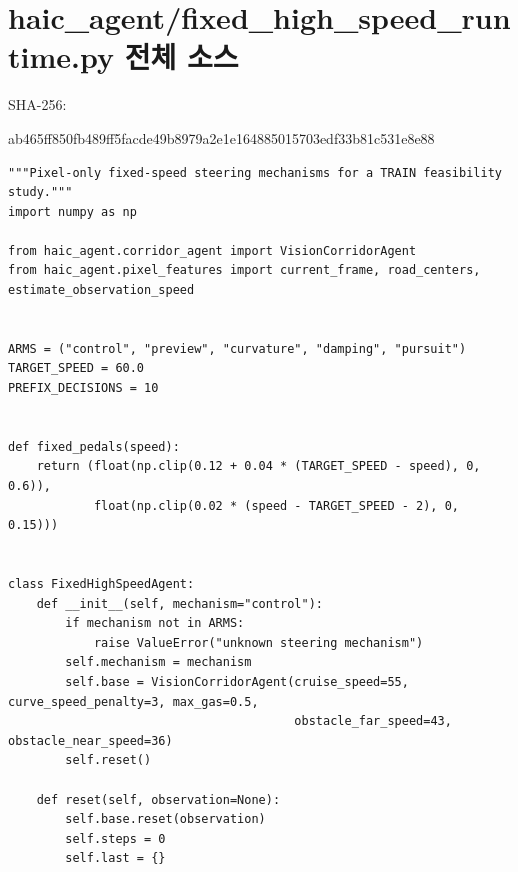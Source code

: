\documentclass[11pt,a4paper]{article}
\begin{document}
\section{haic\_agent/fixed\_high\_speed\_runtime.py 전체 소스}
{\footnotesize SHA-256:\par\ttfamily ab465ff850fb489ff5facde49b8979a2e1e164885015703edf33b81c531e8e88}
\begin{lstlisting}
"""Pixel-only fixed-speed steering mechanisms for a TRAIN feasibility study."""
import numpy as np

from haic_agent.corridor_agent import VisionCorridorAgent
from haic_agent.pixel_features import current_frame, road_centers, estimate_observation_speed


ARMS = ("control", "preview", "curvature", "damping", "pursuit")
TARGET_SPEED = 60.0
PREFIX_DECISIONS = 10


def fixed_pedals(speed):
    return (float(np.clip(0.12 + 0.04 * (TARGET_SPEED - speed), 0, 0.6)),
            float(np.clip(0.02 * (speed - TARGET_SPEED - 2), 0, 0.15)))


class FixedHighSpeedAgent:
    def __init__(self, mechanism="control"):
        if mechanism not in ARMS:
            raise ValueError("unknown steering mechanism")
        self.mechanism = mechanism
        self.base = VisionCorridorAgent(cruise_speed=55, curve_speed_penalty=3, max_gas=0.5,
                                        obstacle_far_speed=43, obstacle_near_speed=36)
        self.reset()

    def reset(self, observation=None):
        self.base.reset(observation)
        self.steps = 0
        self.last = {}


\end{lstlisting}
\end{document}
